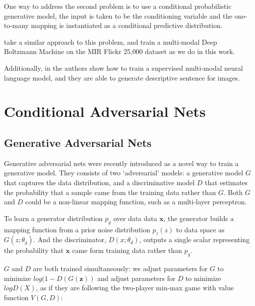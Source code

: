 \documentclass{article} %
\begin{document}
One way to address the second problem is to use a conditional probabilistic generative model, the input is taken to be
the conditioning variable and the one-to-many mapping is instantiated as a conditional predictive distribution.



\cite{Srivastava+Salakhutdinov-NIPS2012-small} take a similar approach to this problem, and train a multi-modal
Deep Boltzmann Machine on the MIR Flickr 25,000 dataset as we do in this work.

Additionally, in \cite{kiros2013multimodal} the authors show how to train a supervised multi-modal neural language model, and they are able to
generate descriptive sentence for images.

\section{Conditional Adversarial Nets}
\subsection{Generative Adversarial Nets}
Generative adversarial nets were recently introduced as a novel way to train a generative model. They consists
of two `adversarial' models: a generative model ${G}$ that captures the data distribution, and a discriminative model ${D}$
that estimates the probability that a sample came from the training data rather than ${G}$.
Both ${G}$ and ${D}$ could be a non-linear mapping function, such as a multi-layer perceptron.

To learn a generator distribution ${p_g}$ over data data ${\bm{x}}$, the generator builds a mapping function
from a prior noise distribution ${p_z(z)}$ to data space as ${G(z;\theta_g)}$. And the discriminator, ${D(x; \theta_d)}$, outputs
a single scalar representing the probability that ${\bm{x}}$ came form training data rather than ${p_g}$.

${G}$ and ${D}$ are both trained simultaneously: we adjust parameters for ${G}$ to minimize ${log(1-D(G(\bm{z}))}$ and
adjust parameters for $D$ to minimize ${logD(X)}$, as if they are following the two-player min-max game with value function ${V(G, D)}$:
\end{document}
